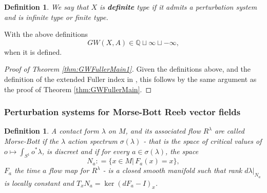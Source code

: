 \documentclass{amsart}
\numberwithin{equation}{section}
\newtheorem{definition}[equation]{Definition}
\theoremstyle{definition}
\theoremstyle{remark}
\newtheorem{remark}[equation]{Remark}
\begin{document}
\begin{definition} We say that $X$ is
   \textbf{\emph{definite}} type if it admits a perturbation system and is infinite type or finite type.
\end{definition}
With the above definitions $$GW (X, A) \in \mathbb{Q} \sqcup {\infty} \sqcup {- \infty}, $$
when it is defined.
\begin{proof} [Proof of Theorem \ref{thm:GWFullerMain1}]
  Given the definitions above, and the definition of the extended Fuller index in \cite{citeSavelyevFuller}, this follows by the same argument as the proof of Theorem \ref{thm:GWFullerMain}.
\end{proof}
\subsubsection {Perturbation systems for Morse-Bott Reeb vector fields}
\begin{definition} \label{def:MorseBott}
A contact form $\lambda$ on $M$, and its associated flow $R ^{\lambda} $ are called \emph{Morse-Bott} if the $\lambda$
action spectrum $\sigma (\lambda)$ - that is the space of
   critical values of $o \mapsto \int _{S ^{1} } o ^{*} \lambda  $,
is discreet and if for every $a \in
\sigma (\lambda)$, the space $$N _{a}: = \{x \in M | \, F _{a} (x)
=x \},   $$ $F _{a} $ the time $a$ flow map for $R ^{\lambda} $ - is a closed smooth
manifold such that rank $d \lambda |  _{N _{a} } $ is locally constant
and $T _{x} N _{a} = \ker (d F _{a} - I ) _{x}   $.
\end{definition}
\end{document}
